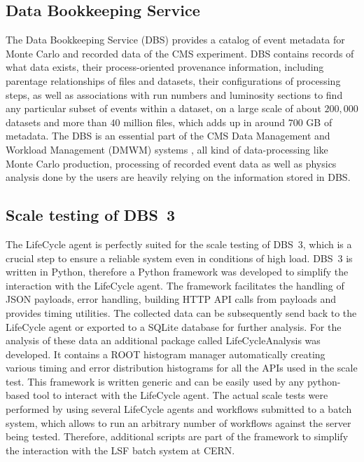 \subsection{Data Bookkeeping Service}
The Data Bookkeeping Service (DBS) \cite{DBS} provides a catalog of event metadata for Monte Carlo and recorded data of the CMS experiment. DBS contains records of what data exists, their process-oriented provenance information, including parentage relationships of files and datasets, their configurations of processing steps, as well as associations with run numbers and luminosity sections to find any particular subset of events within a dataset, on a large scale of about $200,000$ datasets and more than $40$ million files, which adds up in around $700$ GB of metadata. The DBS is an essential part of the CMS Data Management and Workload Management (DMWM) systems \cite{CMSDMS}, all kind of data-processing like Monte Carlo production, processing of recorded event data as well as physics analysis done by the users are heavily relying on the information stored in DBS.

\subsection{Scale testing of DBS~3}
The LifeCycle agent is perfectly suited for the scale testing of DBS~3, which is a crucial step to ensure a reliable system even in conditions of high load. DBS~3 is written in Python, therefore a Python framework was developed to simplify the interaction with the LifeCycle agent. The framework facilitates the handling of JSON payloads, error handling, building HTTP API calls from payloads and provides timing utilities. The collected data can be subsequently send back to the LifeCycle agent or exported to a SQLite database for further analysis. For the analysis of these data an additional package called LifeCycleAnalysis was developed. It contains a ROOT histogram manager automatically creating various timing and error distribution histograms for all the APIs used in the scale test. This framework is written generic and can be easily used by any python-based tool to interact with the LifeCycle agent. The actual scale tests were performed by using several LifeCycle agents and workflows submitted to a batch system, which allows to run an arbitrary number of workflows against the server being tested. Therefore, additional scripts are part of the framework to simplify the interaction with the LSF batch system at CERN.
